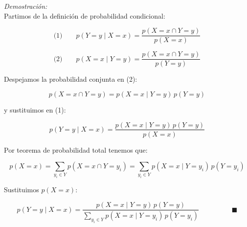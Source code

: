 \textit{Demostración:}\\
Partimos de la definición de probabilidad condicional:

\[
\text{(1)} \qquad
p(Y = y \mid X = x)
=
\frac{p(X = x \cap Y = y)}{p(X = x)}
\]

\[
\text{(2)} \qquad
p(X = x \mid Y = y)
=
\frac{p(X = x \cap Y = y)}{p(Y = y)}
\]

Despejamos la probabilidad conjunta en (2):

\[
p(X = x \cap Y = y)
=
p(X = x \mid Y = y)\,p(Y = y)
\]

y sustituimos en (1):

\[
p(Y = y \mid X = x)
=
\frac{p(X = x \mid Y = y)\,p(Y = y)}{p(X = x)}
\]

Por teorema de probabilidad total tenemos que:

\[
p(X = x)
=
\sum_{y_i \in Y} p(X = x \cap Y = y_i)
=
\sum_{y_i \in Y} p(X = x \mid Y = y_i)\,p(Y = y_i)
\]

Sustituimos \(p(X = x)\):

\[
p(Y = y \mid X = x)
=
\frac{
p(X = x \mid Y = y)\,p(Y = y)
}{
\displaystyle \sum_{y_i \in Y} p(X = x \mid Y = y_i)\,p(Y = y_i)
}
\hspace{2cm} \blacksquare
\]

